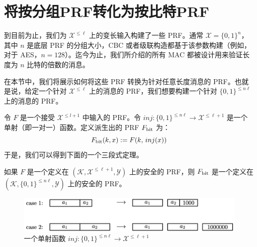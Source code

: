 \section{将按分组PRF转化为按比特PRF}\label{sec:6-8}

到目前为止，我们为 $\mathcal{X}^{\leq\ell}$ 上的变长输入构建了一些 PRF。通常 $\mathcal{X}=\{0,1\}^n$，其中 $n$ 是底层 PRF 的分组大小，CBC 或者级联构造都基于该参数构建（例如，对于 AES，$n=128$）。迄今为止，我们所介绍的所有 MAC 都被设计用来验证长度为 $n$ 比特的倍数的消息。

在本节中，我们将展示如何将这些 PRF 转换为针对任意长度消息的 PRF。也就是说，给定一个针对 $\mathcal{X}^{\leq\ell}$ 上的消息的 PRF，我们想要构建一个针对 $\{0,1\}^{\leq n\ell}$ 上的消息的 PRF。

令 $F$ 是一个接受 $\mathcal{X}^{\leq l+1}$ 中输入的 PRF。令 $inj:\{0,1\}^{\leq n\ell}\to\mathcal{X}^{\leq\ell+1}$ 是一个单射（即一对一）函数。定义派生出的 PRF $F_{\rm bit}$ 为：
\[
F_{\rm bit}(k,x):=F(k,\,inj(x))
\]
于是，我们可以得到下面的一个三段式定理。

\begin{theorem}\label{theo:6-10}
如果 $F$ 是一个定义在 $(\mathcal{K},\mathcal{X}^{\leq\ell+1},\mathcal{Y})$ 上的安全的 PRF，则 $F_{\rm bit}$ 是一个定义在 $(\mathcal{K},\{0,1\}^{\leq n\ell},\mathcal{Y})$ 上的安全的 PRF。
\end{theorem}

\begin{figure}
  \centering
  \includegraphics[width=0.75\linewidth]{figures/chapter6/fig7.png}
  \caption{一个单射函数 $inj:\{0,1\}^{\leq n\ell}\to\mathcal{X}^{\leq\ell+1}$}
  \label{fig:6-7}
\end{figure}

